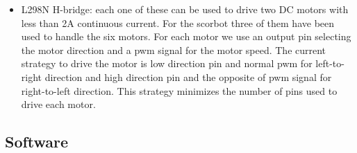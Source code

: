 \begin{itemize}
\item L298N H-bridge: each one of these can be used to drive two DC motors with less than 2A continuous current. For the scorbot three of them have been used to handle the six motors. For each motor we use an output pin selecting the motor direction and a pwm signal for the motor speed. The current strategy to drive the motor is low direction pin and normal pwm for left-to-right direction and high direction pin and the opposite of pwm signal for right-to-left direction. This strategy minimizes the number of pins used to drive each motor. 
 \end{itemize}
\subsection{Software}
 